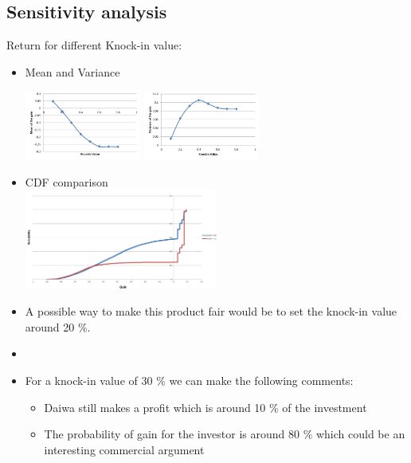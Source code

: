 \subsection{Sensitivity analysis}
\begin{frame}
\myframetitle{}
Return for different Knock-in value:
\begin{itemize}
	\item Mean and Variance \\
	\begin{center}
	\includegraphics[width=0.3\textwidth]{../Report/Mean_depending_on_knockin}
	\hspace{2cm}
	\includegraphics[width=0.3\textwidth]{../Report/Variance_depending_on_knockin}
	\end{center}
	\item CDF comparison \\
	\centering
	\includegraphics[width=0.5\textwidth]{../Report/KnockInCDFComparaison}
\end{itemize}
\end{frame}

\begin{frame}[c]
\myframetitle{}
\begin{itemize}
	\item A possible way to make this product fair would be to set the knock-in value around 20 \%.
	\item []
	\item For a knock-in value of 30 \% we can make the following comments: \\
	\begin{itemize}
		\item Daiwa still makes a profit which is around 10 \% of the investment
		\item The probability of gain for the investor is around 80 \% which could be an interesting commercial argument
	\end{itemize}
\end{itemize}
\end{frame}

